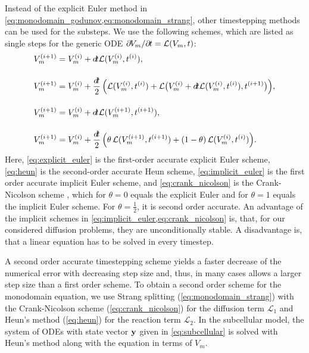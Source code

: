 Instead of the explicit Euler method in \cref{eq:monodomain_godunov,eq:monodomain_strang}, other timestepping methods can be used for the substeps. 
We use the following schemes, which are listed as single steps for the generic ODE ${\p V_m / \p t = \mathcal{L}(V_m,t)}$:
\begin{subequations}\label{eq:ode_solver_schemes}
  \begin{align}
    V_m^{(i+1)} &= V_m^{(i)} + \dt \mathcal{L}(V_m^{(i)},t^{(i)}), \label{eq:explicit_euler}\\[4mm]
    V_m^{(i+1)} &= V_m^{(i)} + \dfrac{\dt}{2}\Big(
      \mathcal{L}(V_m^{(i)},t^{(i)}) + \mathcal{L}\big(V_m^{(i)} + \dt \mathcal{L}(V_m^{(i)},t^{(i)}),t^{(i+1)}\big)\Big), \label{eq:heun}\\[4mm]
    V_m^{(i+1)} &= V_m^{(i)} + \dt \mathcal{L}(V_m^{(i+1)},t^{(i+1)}), \label{eq:implicit_euler}\\[4mm]
    V_m^{(i+1)} &= V_m^{(i)} + \dfrac{\dt}{2}\Big(
      \theta\,\mathcal{L}(V_m^{(i+1)},t^{(i+1)}) + (1-\theta)\,\mathcal{L}(V_m^{(i)},t^{(i)})\Big).\label{eq:crank_nicolson}
  \end{align}
\end{subequations}
%
Here, \cref{eq:explicit_euler} is the first-order accurate explicit Euler scheme, \cref{eq:heun} is the second-order accurate Heun scheme, \cref{eq:implicit_euler} is the first order accurate implicit Euler scheme, and \cref{eq:crank_nicolson} is the Crank-Nicolson scheme \cite{CrankNicolson1947}, which for $\theta=0$ equals the explicit Euler and for $\theta=1$ equals the implicit Euler scheme. For $\theta=\frac12$, it is second order accurate. An advantage of the implicit schemes in \cref{eq:implicit_euler,eq:crank_nicolson} is, that, for our considered diffusion problems, they are unconditionally stable. A disadvantage is, that a linear equation has to be solved in every timestep.

A second order accurate timestepping scheme yields a faster decrease of the numerical error with decreasing step size and, thus, in many cases allows a larger step size than a first order scheme.
To obtain a second order scheme for the monodomain equation, we use Strang splitting (\cref{eq:monodomain_strang}) with the Crank-Nicolson scheme (\cref{eq:crank_nicolson}) for the diffusion term $\mathcal{L}_1$ and Heun's method (\cref{eq:heun}) for the reaction term $\mathcal{L}_2$. In the subcellular model, the system of ODEs with state vector $\textbf{y}$ given in \cref{eq:subcellular} is solved with Heun's method along with the equation in terms of $V_m$.

